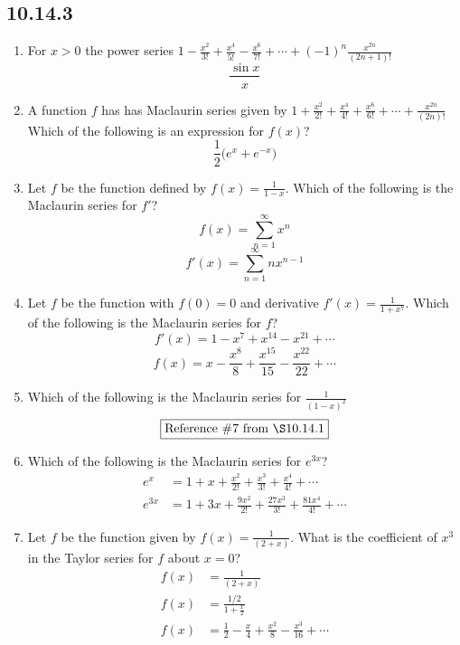 \documentclass[12pt]{article}
\begin{document}
\subsection*{10.14.3}
\begin{enumerate}
	\item For $x>0$ the power series $1-\frac{x^2}{3!} + \frac{x^4}{5!} - \frac{x^6}{7!} + \cdots + (-1)^n \frac{x^{2n}}{(2n+1)!}$
	      $$\boxed{\frac{\sin x}{x}}$$
	\item A function $f$ has has Maclaurin series given by $1+ \frac{x^2}{2!} + \frac{x^4}{4!} + \frac{x^6}{6!} + \cdots + \frac{x^{2n}}{(2n)!}$ Which of the following is an expression for $f(x)$?
	      $$\boxed{\frac{1}{2}\big(e^{x} + e^{-x}\big)}$$
	\item Let $f$ be the function defined by $f(x)=\frac{1}{1-x}$. Which of the following is the Maclaurin series for $f'$?
	      $$f(x) = \sum_{n=1}^{\infty} x^{n}$$
	      $$\boxed{f'(x) = \sum_{n=1}^{\infty} nx^{n-1}}$$
	\item Let $f$ be the function with $f(0)=0$ and derivative $f'(x)=\frac{1}{1+x^7}$. Which of the following is the Maclaurin series for $f$?
	      $$f'(x) = 1 - x^7 + x^{14} -x^{21} + \cdots$$
	      $$\boxed{f(x) = x-\frac{x^8}{8} + \frac{x^{15}}{15}-\frac{x^{22}}{22} + \cdots}$$
	\item Which of the following is the Maclaurin series for $\frac{1}{(1-x)^2}$
	      $$\boxed{\text{Reference } \# 7 \text{ from } \S 10.14.1}$$
	\item Which of the following is the Maclaurin series for $e^{3x}$?
	      \begin{align*}
	      	e^x    & = 1+ x + \frac{x^2}{2!} + \frac{x^3}{3!} + \frac{x^4}{4!} + \cdots                \\
	      	e^{3x} & = \boxed{1 + 3x + \frac{9x^2}{2!} + \frac{27x^3}{3!} + \frac{81x^4}{4!} + \cdots} 
	      \end{align*}
	\item Let $f$ be the function given by $f(x)=\frac{1}{(2+x)}$. What is the coefficient of $x^3$ in the Taylor series for $f$ about $x = 0$?
	      \begin{align*}
	      	f(x) & = \frac{1}{(2+x)}                                                  \\ 
	      	f(x) & = \frac{1/2}{1+\frac{x}{2}}                                        \\
	      	f(x) & = \frac{1}{2} - \frac{x}{4}+ \frac{x^2}{8}-\frac{x^3}{16} + \cdots 
	      \end{align*}

\end{enumerate}
\end{document}
